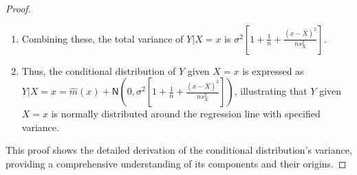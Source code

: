 \documentclass[12pt]{amsart}
\theoremstyle{definition}
\numberwithin{equation}{section}
\begin{document}
\begin{proof}
\begin{enumerate}[label=Step \arabic*:]
    \item Combining these, the total variance of $Y|X=x$ is $\sigma^2\left[1 + \frac{1}{n} + \frac{(x - \bar{X})^2}{ns^2_X}\right]$.
    
    \item Thus, the conditional distribution of $Y$ given $X=x$ is expressed as $Y|X=x = \widehat{m}(x) + \mathsf{N}\left(0, \sigma^2\left[1 + \frac{1}{n} + \frac{(x - \bar{X})^2}{ns^2_X}\right]\right)$, illustrating that $Y$ given $X = x$ is normally distributed around the regression line with specified variance.
\end{enumerate}
This proof shows the detailed derivation of the conditional distribution's variance, providing a comprehensive understanding of its components and their origins.
\end{proof}
\end{document}
